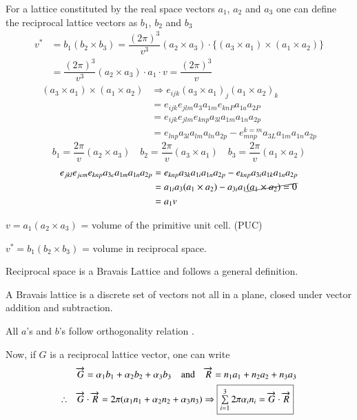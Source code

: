 For a lattice constituted by the real space vectors $a_{1}$, $a_{2}$ and $a_{3}$ one can define the reciprocal lattice vectors as $b_{1}$, $b_{2}$ and $b_{3}$
\begin{align*}
v^{*} &=b_{1}(b_{2}\times b_{3})=\dfrac{(2\pi)^{3}}{v^{3}}(a_{2}\times a_{3})\cdot \{(a_{3}\times a_{1})\times (a_{1}\times a_{2})\}\\
&=\dfrac{(2\pi)^{3}}{v^{3}}(a_{2}\times a_{3})\cdot a_{1}\cdot v=\dfrac{(2\pi)^{3}}{v}
\end{align*}
\begin{align*}
(a_{3}\times a_{1})\times (a_{1}\times a_{2}) &\Rightarrow e_{ijk}(a_{3}\times a_{1})_{j}(a_{1}\times a_{2})_{k}\\
&=e_{ijk}e_{jlm}a_{3}a_{1m}e_{knP}a_{1a}a_{2P}\\
&= e_{ijk}e_{jlm}e_{knp}a_{3l}a_{1m}a_{1n}a_{2p}\\
&=e_{lnp}a_{3l}a_{lm}a_{ln}a_{2p}-e^{k=m}_{mnp}a_{3L}a_{1m}a_{1n}a_{2p}
\end{align*}
$$
b_{1}=\frac{2\pi}{v}(a_{2}\times a_{3})\quad b_{2}=\frac{2\pi}{v}(a_{3}\times a_{1})\quad b_{3}=\frac{2\pi}{v}(a_{1}\times a_{2})
$$
\begin{align*}
e_{jkl}e_{jem}e_{knp}a_{3e}a_{1m}a_{1n}a_{2p} &= e_{knp}a_{3k}a_{1i}a_{1n}a_{2p}-e_{knp}a_{3i}a_{1k}a_{1n}a_{2p}\\
&= a_{1i}a_{3}(a_{1}\times a_{2})-a_{3i}a_{1}\cancel{(a_{1}\times a_{2})=0}\\
&= a_{1}v
\end{align*}

$v=a_{1}(a_{2}\times a_{3})$ =  volume of the primitive unit cell. (PUC)

$v^{*}=b_{1}(b_{2}\times b_{3})$ = volume in reciprocal space.

Reciprocal space is a Bravais Lattice and follows a general definition.

A Bravais lattice is a discrete set of vectors not all in a plane, closed under vector addition and subtraction.

All $a$'s and $b$'s follow orthogonality relation .

Now, if $G$ is a reciprocal lattice vector, one can write
\begin{align*}
 &\overrightarrow{G}=\alpha_{1}b_{1}+\alpha_{2}b_{2}+\alpha_{3}b_{3}\quad \text{and}\quad \overrightarrow{R}=n_{1}a_{1}+n_{2}a_{2}+n_{3}a_{3}\\
\therefore\quad &\overrightarrow{G}\cdot \overrightarrow{R}=2\pi(\alpha_{1}n_{1}+\alpha_{2}n_{2}+\alpha_{3}n_{3})\Rightarrow \fbox{$\sum\limits_{i=1}^{3}2\pi \alpha_{i}n_{i}=\overrightarrow{G}\cdot \overrightarrow{R}$}
\end{align*}

